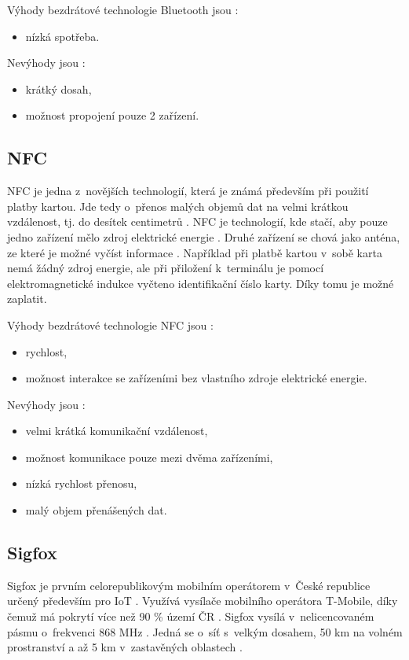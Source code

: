 Výhody bezdrátové technologie Bluetooth jsou \cite{Bezdrat_muni}:
\begin{itemize}
  \item nízká spotřeba.
\end{itemize}

Nevýhody jsou \cite{Bezdrat_muni}:
\begin{itemize}
  \item krátký dosah,
  \item možnost propojení pouze 2 zařízení.
\end{itemize}

\subsection{NFC}
NFC je jedna z~novějších technologií, která je známá především při použití platby kartou. Jde tedy o~přenos malých objemů dat na velmi krátkou 
vzdálenost, tj. do desítek centimetrů \cite{Bezdrat_muni}. NFC je technologií, kde stačí, aby pouze jedno zařízení mělo zdroj elektrické 
energie \cite{Bezdrat_muni}. Druhé zařízení se chová jako anténa, ze které je možné vyčíst informace \cite{Bezdrat_muni}. Například při 
platbě kartou v~sobě karta nemá žádný zdroj energie, ale při přiložení k~terminálu je pomocí elektromagnetické indukce vyčteno identifikační
číslo karty. Díky tomu je možné zaplatit. 

Výhody bezdrátové technologie NFC jsou \cite{Bezdrat_muni}:
\begin{itemize}
  \item rychlost,
  \item možnost interakce se zařízeními bez vlastního zdroje elektrické energie.
\end{itemize}

Nevýhody jsou \cite{Bezdrat_muni}:
\begin{itemize}
  \item velmi krátká komunikační vzdálenost,
  \item možnost komunikace pouze mezi dvěma zařízeními, 
  \item nízká rychlost přenosu,
  \item malý objem přenášených dat.
\end{itemize}

\subsection{Sigfox}
Sigfox je prvním celorepublikovým mobilním operátorem v~České republice určený především pro IoT \cite{Sigfox_cz}. Využívá vysílače mobilního operátora T-Mobile, 
díky čemuž má pokrytí více než 90 \% území ČR \cite{Sigfox_Zooco}. Sigfox vysílá v~nelicencovaném pásmu o~frekvenci 868 MHz \cite{Sigfox_cz}. Jedná se o~síť 
s~velkým dosahem, 50 km na volném prostranství a až 5 km v~zastavěných oblastech \cite{Sigfox_Zooco}.  

